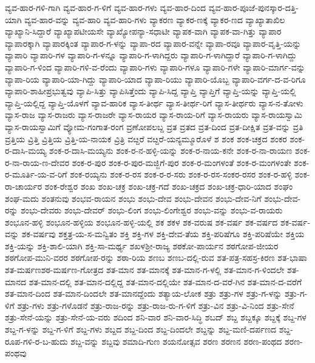 ವ್ಯವ-ಹಾರ-ಗಳಿ-ಗಾಗಿ
ವ್ಯವ-ಹಾರ-ಗ-ಳಿಗೆ
ವ್ಯವ-ಹಾರ-ಗಳು
ವ್ಯವ-ಹಾರ-ದಿಂದ
ವ್ಯವ-ಹಾರ-ಪೂಜೆ-ಪುನಸ್ಕಾರ-ದತ್ತಿ-ಯಾಗಿ
ವ್ಯವ-ಹಾರ-ವನ್ನು
ವ್ಯವ-ಹಾರಿ
ವ್ಯವ-ಹಾರಿ-ಗಳು
ವ್ಯಾಕರಣ
ವ್ಯಾಕರ-ಣಕ್ಕೆ
ವ್ಯಾಕರ-ಣದ
ವ್ಯಾಖ್ಯಾತಾಖಿಲ
ವ್ಯಾಖ್ಯಾನಿ-ಸಿದ್ದಾರೆ
ವ್ಯಾಖ್ಯಾಪಟೀಯಸೇ
ವ್ಯಾಖ್ಯೋಪನ್ಯಾ-ಸಧಾಟೀ
ವ್ಯಾಪಕ-ವಾಗಿ
ವ್ಯಾಪಕ-ವಾ-ಗಿತ್ತು
ವ್ಯಾಪಾರ
ವ್ಯಾಪಾರಕ್ಕಾಗಿ
ವ್ಯಾಪಾರಕ್ಕಿಂತ
ವ್ಯಾಪಾರ-ಗ-ಳನ್ನು
ವ್ಯಾಪಾ-ರದ
ವ್ಯಾಪಾರ-ವನ್ನೇ
ವ್ಯಾಪಾ-ರವೂ
ವ್ಯಾಪಾರ-ವೃತ್ತಿ-ಯನ್ನು
ವ್ಯಾಪಾರಿ
ವ್ಯಾಪಾರಿ-ಗಳ
ವ್ಯಾಪಾರಿ-ಗ-ಳನ್ನೂ
ವ್ಯಾಪಾರಿ-ಗ-ಳಾಗಿದ್ದರು
ವ್ಯಾಪಾರಿ-ಗ-ಳಾಗಿದ್ದಾರೆ
ವ್ಯಾಪಾರಿ-ಗ-ಳಾಗಿದ್ದು
ವ್ಯಾಪಾರಿ-ಗ-ಳಿಂದ
ವ್ಯಾಪಾರಿ-ಗಳಿ-ವ-ರೆಂದು
ವ್ಯಾಪಾರಿ-ಗಳು
ವ್ಯಾಪಾರಿ-ಗಳೂ
ವ್ಯಾಪಾರಿ-ಗಳೇ
ವ್ಯಾಪಾರಿ-ಮಾರ್ಗ-ವನ್ನು
ವ್ಯಾಪಾ-ರಿಯ
ವ್ಯಾಪಾರಿ-ಯಾ-ಗಿದ್ದು
ವ್ಯಾಪಾರಿ-ಯಾದ
ವ್ಯಾಪಾ-ರಿಯು
ವ್ಯಾಪಾರಿ-ಯೊಬ್ಬ
ವ್ಯಾಪಾರಿ-ವರ್ಗ-ದ-ವ-ರಿಗೂ
ವ್ಯಾಪಾರಿ-ಶಾಹೀಪ್ರಭುತ್ವವು
ವ್ಯಾಪಿ-ಸಿತ್ತು
ವ್ಯಾಪಿಸಿತ್ತೆಂದು
ವ್ಯಾಪಿ-ಸಿದ್ದ
ವ್ಯಾಪ್ತಿ
ವ್ಯಾಪ್ತಿಗೆ
ವ್ಯಾಪ್ತಿ-ಯನ್ನು
ವ್ಯಾಪ್ತಿ-ಯಲ್ಲಿ
ವ್ಯಾಪ್ತಿ-ಯಲ್ಲಿದ್ದ
ವ್ಯಾಪ್ತಿ-ಯೊಳಗೆ
ವ್ಯಾವ-ಹಾರಿಕ
ವ್ಯಾಸ-ತೀರ್ಥ
ವ್ಯಾಸ-ತೀರ್ಥ-ರಿಗೆ
ವ್ಯಾಸ-ತೀರ್ಥರು
ವ್ಯಾಸ-ನ-ತೋಳು
ವ್ಯಾಸ-ರಾಜ
ವ್ಯಾಸ-ರಾಜರು
ವ್ಯಾಸ-ರಾಜರೇ
ವ್ಯಾಸ-ರಾಯರ
ವ್ಯಾಸ-ರಾಯ-ರಿಗೆ
ವ್ಯಾಸ-ರಾಯರು
ವ್ಯಾಸ-ರಾಯಸ್ವಾಮಿ
ವ್ಯಾಸ-ರಾಯಸ್ವಾಮಿಗೆ
ವ್ಯೋಮ-ಗಂಗಾತ-ರಂಗ
ವ್ರಣೋಪಲಬ್ದ
ವ್ರತ
ವ್ರತದ
ವ್ರತ-ದಿಂದ
ವ್ರತ-ದೀಕ್ಷಿತ
ವ್ರತ-ವನ್ನು
ವ್ರತಿ
ವ್ರತ್ತಿಯ
ವ್ರಿತ್ತಿ
ವ್ರಿತ್ತಿಯ
ವ್ರಿತ್ತಿ-ಯ-ನಾಯಕ
ವ್ರಿತ್ರಿ
ವೞ್ದರೆ
ವೞ್ದರೆ-ಯನ್ಯಮ್ಮೂರೊಳೆ
ಶ
ಶಂಕ
ಶಂಕ-ಚಕ್ರದ
ಶಂಕರ
ಶಂಕ-ರ-ದಾಸಿ-ಮಯ್ಯ
ಶಂಕ-ರ-ದಾಸಿ-ಮಯ್ಯನು
ಶಂಕ-ರ-ನ-ಹಳ್ಳಿ-ಯನ್ನು
ಶಂಕ-ರ-ನಾಯ-ಕನೇ
ಶಂಕ-ರ-ನಾ-ರಾಯಣ
ಶಂಕ-ರ-ನಾ-ರಾಯ-ಣ-ದೇವರ
ಶಂಕ-ರ-ಪುರ
ಶಂಕ-ರ-ಪುರ-ಮಜ್ಜಿಗೆ-ಪುರ
ಶಂಕ-ರ-ಮಂಗಳಂತೆ
ಶಂಕ-ರ-ಮಂಗಳಂತೇ
ಶಂಕ-ರ-ಮೂರ್ತಿ-ಯ-ವ-ರಿಗೆ
ಶಂಕ-ರಯ್ಯನು
ಶಂಕ-ರ-ರಸ
ಶಂಕ-ರ-ರ-ಸರು
ಶಂಕ-ರ-ರಸ-ಸಂಕರ-ರಸರ
ಶಂಕ-ರ-ಹಳ್ಳಿ
ಶಂಕ-ರಾ-ಚಾರ್ಯರ
ಶಂಕ-ರೇಶ್ವರ
ಶಂಖ
ಶಂಖ-ಚಕ್ರ
ಶಂಖ-ಚಕ್ರ-ಗದೆ
ಶಂಖ-ಚಕ್ರದ
ಶಂಖ-ಚಕ್ರ-ಧಾರಿ-ಯಾದ
ಶಂಘಂ
ಶಂಘ-ಮದು
ಶಂತನುವು
ಶಂಭವ-ರಾಯನ
ಶಂಭು
ಶಂಭು-ದೇವ
ಶಂಭು-ದೇವನ
ಶಂಭು-ದೇವ-ನಿಗೆ
ಶಂಭು-ದೇವ-ರನ್ನು
ಶಂಭು-ದೇವರು
ಶಂಭು-ದೇವರ್
ಶಂಭು-ಲಿಂಗ
ಶಂಭು-ಲಿಂಗೇಶ್ವರ
ಶಂಭು-ವನ್ನು
ಶಂಭು-ವ-ರಾಯರು
ಶಂಭೂನ-ಹಳ್ಳಿ
ಶಂಭೂನ-ಹಳ್ಳಿಯ
ಶಂಭೂನ-ಹಳ್ಳಿ-ಯಲ್ಲಿ
ಶಕ
ಶಕಳ
ಶಕ-ವರುಷ
ಶಕ-ವರ್ಷ
ಶಕ-ವರ್ಷದ
ಶಕ-ವರ್ಷ-ವನ್ನು
ಶಕ-ವರ್ಷವು
ಶಕ್ತತ್ರ-ಯ-ಸ-ಮನ್ವಿತಂ
ಶಕ್ತಿ
ಶಕ್ತಿ-ಗಳ
ಶಕ್ತಿ-ದೇವ-ತೆಯ
ಶಕ್ತಿ-ಪರಿಷೆಗೂ
ಶಕ್ತಿ-ಪರಿಷೆಯೇ
ಶಕ್ತಿಯ
ಶಕ್ತಿ-ಯನ್ನು
ಶಕ್ತಿ-ಶಾಲಿ-ಯಾಗಿ
ಶಕ್ತಿ-ಸಾ-ಮರ್ಥ್ಯ
ಶಖಳಶ್ರೀ-ರಾಜ್ಯ
ಶಠಕೋ-ಪಾರ್ಯನ
ಶಠಗೋಪ-ಜೀಯರ
ಶಠಗೋಪ-ಮುನಿ-ವರರ
ಶಠಗೋಪ-ರನ್ನು
ಶಠಾ-ರಿಯ
ಶಣಬ
ಶಣಬ-ದಲ್ಲಿ-ರುವ
ಶತ-ಪತ್ರ-ಸಹಸ್ರ-ಕಿರಣ
ಶತ-ಭಾಷಾ
ಶತ-ಮರ್ಷಣಶಠ-ಮರ್ಷಣ-ಗೋತ್ರದ
ಶತ-ಮಾನ
ಶತ-ಮಾನಕ್ಕೆ
ಶತ-ಮಾನ-ಗ-ಳಲ್ಲಿ
ಶತ-ಮಾನ-ಗ-ಳಿಂದಲೇ
ಶತ-ಮಾನದ
ಶತ-ಮಾನ-ದಲ್ಲಿ
ಶತ-ಮಾನ-ದಲ್ಲಿದ್ದ
ಶತ-ಮಾನ-ದಲ್ಲಿಯೇ
ಶತ-ಮಾನ-ದ-ವರೆ-ಗಿನ
ಶತ-ಮಾನ-ದ-ವರೆಗೆ
ಶತ-ಮಾನ-ದಿಂದ
ಶತ-ಮಾನ-ದಿಂದಲೇ
ಶತ-ಮಾನದ್ದೆಂದು
ಶತ್ಯಾಯ-ಲೋಕ
ಶತ್ರು
ಶತ್ರು-ಗಳ
ಶತ್ರು-ಗ-ಳನ್ನು
ಶತ್ರು-ಗ-ಳಿಗೆ
ಶತ್ರು-ಗಳು
ಶತ್ರು-ಗಳೊಡನೆ
ಶತ್ರು-ರಾಜ-ರನ್ನು
ಶತ್ರು-ರಾಜ-ರು-ಗ-ಳಿಗೆ
ಶತ್ರು-ವಿನ
ಶತ್ರು-ವಿ-ನಿಂದ
ಶತ್ರು-ಸೇನೆ
ಶತ್ರು-ಸೇನೆ-ಯನ್ನು
ಶತ್ರು-ಸೇನೆ-ಯ-ವರು
ಶದಿಂದ
ಶನಿ-ವಾರ
ಶನಿ-ವಾರ-ಸಿದ್ಧಿ
ಶಬದ್
ಶಬ್ದ
ಶಬ್ದಕ್ಕೂ
ಶಬ್ದಕ್ಕೆ
ಶಬ್ದ-ಗಳ
ಶಬ್ದ-ಗ-ಳನ್ನು
ಶಬ್ದ-ಗ-ಳಿಗೆ
ಶಬ್ದ-ಗಳು
ಶಬ್ದದ
ಶಬ್ದ-ದಿಂದ
ಶಬ್ದ-ದಿಂದಲೇ
ಶಬ್ದನ್ನು
ಶಬ್ದ-ಮಣಿ-ದರ್ಪಣದ
ಶಬ್ದ-ರೂಪ-ಗಳಿ-ರ-ಬ-ಹುದು
ಶಬ್ದ-ವನ್ನು
ಶಬ್ದವು
ಶಮಾದಿ-ಗುಣ
ಶಯನೋತ್ಸವ
ಶರಣ
ಶರಣನ
ಶರಣ-ಪಂಥದ
ಶರಣ-ಪಂಥವು
